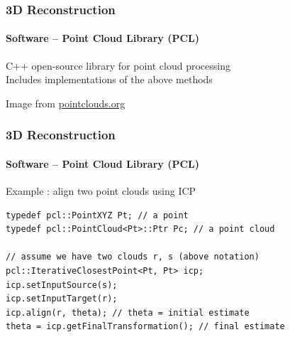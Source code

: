 \documentclass[xetex,professionalfont]{beamer}
\begin{document}

\begin{frame}
\frametitle{3D Reconstruction}
\framesubtitle{Software -- Point Cloud Library (PCL)}

C++ open-source library for point cloud processing\\\medskip
Includes implementations of the above methods

\bigskip
\begin{center}
    {\centering Image from \url{pointclouds.org}}
\end{center}

\end{frame}


\begin{frame}[fragile]
\frametitle{3D Reconstruction}
\framesubtitle{Software -- Point Cloud Library (PCL)}

Example : align two point clouds using ICP

\bigskip
\begin{verbatim}
typedef pcl::PointXYZ Pt; // a point
typedef pcl::PointCloud<Pt>::Ptr Pc; // a point cloud

// assume we have two clouds r, s (above notation)
pcl::IterativeClosestPoint<Pt, Pt> icp;
icp.setInputSource(s);
icp.setInputTarget(r);
icp.align(r, theta); // theta = initial estimate
theta = icp.getFinalTransformation(); // final estimate
\end{verbatim}

\end{frame}

\end{document}

